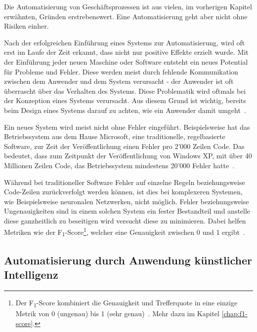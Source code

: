 Die Automatisierung von Geschäftsprozessen ist aus vielen, im vorherigen Kapitel erwähnten, Gründen erstrebenswert. Eine Automatisierung geht aber nicht ohne Risiken einher.


Nach der erfolgreichen Einführung eines Systems zur Automatisierung, wird oft erst im Laufe der Zeit erkannt, dass nicht nur positive Effekte erzielt wurde. Mit der Einführung jeder neuen Maschine oder Software entsteht ein neues Potential für Probleme und Fehler. Diese werden meist durch fehlende Kommunikation zwischen dem Anwender und dem System verursacht - der Anwender ist oft überrascht über das Verhalten des Systems. Diese Problematik wird oftmals bei der Konzeption eines Systems verursacht. Aus diesem Grund ist wichtig, bereits beim Design eines Systems darauf zu achten, wie ein Anwender damit umgeht~\autocite{Sarter1997}. 

Ein neues System wird meist nicht ohne Fehler eingeführt. Beispielsweise hat das Betriebssystem aus dem Hause Microsoft, eine traditionelle, regelbasierte Software, zur Zeit der Veröffentlichung einen Fehler pro 2'000 Zeilen Code. Das bedeutet, dass zum Zeitpunkt der Veröffentlichung von Windows XP, mit über 40 Millionen Zeilen Code, das Betriebssystem mindestens 20'000 Fehler hatte~\autocite{TheEconomist2010}. 

Während bei traditioneller Software Fehler auf einzelne Regeln beziehungsweise Code-Zeilen zurückverfolgt werden können, ist dies bei komplexeren Systemen, wie Beispielsweise neuronalen Netzwerken, nicht möglich. Fehler beziehungsweise Ungenauigkeiten sind in einem solchen System ein fester Bestandteil und anstelle diese ganzheitlich zu beseitigen wird versucht diese zu minimieren. Dabei helfen Metriken wie der F\textsubscript{1}-Score\footnote{Der F\textsubscript{1}-Score kombiniert die Genauigkeit und Trefferquote in eine einzige Metrik von 0 (ungenau) bis 1 (sehr genau)~\autocite{VanRijsbergen1979}. Mehr dazu im Kapitel \ref{chap:f1-score}.}, welcher eine Genauigkeit zwischen 0 und 1 ergibt~\autocite{VanRijsbergen1979}.

\subsection{Automatisierung durch Anwendung künstlicher Intelligenz}

